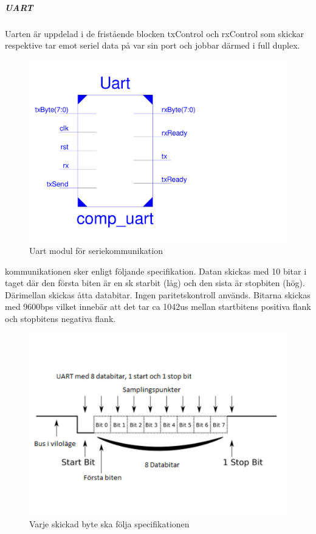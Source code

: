 \documentclass[a4paper]{scrartcl}
\begin{document}
		\subparagraph{UART}
		
		Uarten är uppdelad i de fristående blocken txControl och rxControl som skickar respektive tar emot seriel data på var sin port och jobbar därmed i full duplex. 
		\begin{figure}[H]
			\centering
			\includegraphics[scale=0.4]{uartschematic.pdf}
			\caption{Uart modul för seriekommunikation}
		\end{figure}
		kommunikationen sker enligt följande specifikation.
		Datan skickas med 10 bitar i taget där den första biten är en sk starbit (låg) och den sista är stopbiten (hög). Därimellan skickas åtta databitar. Ingen paritetskontroll används. Bitarna skickas med 9600bps vilket innebär att det tar ca 1042us 				mellan startbitens positiva flank och stopbitens negativa flank.
		\begin{figure}[H]
			\centering
			\includegraphics[scale=0.4]{uartsignal.pdf}
			\caption{Varje skickad byte ska följa specifikationen}
		\end{figure}
\end{document}
